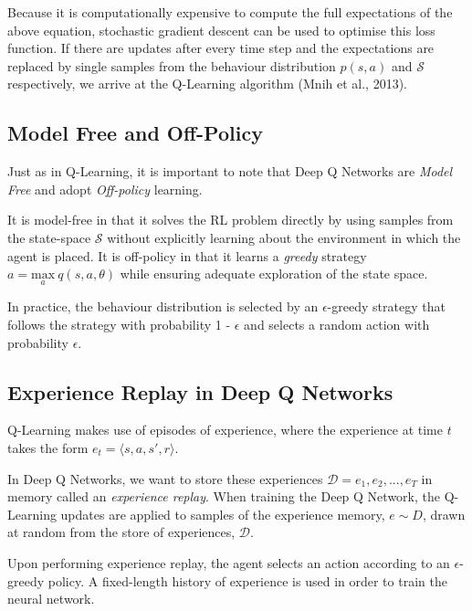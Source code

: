 \documentclass{article}
\begin{document}
Because it is computationally expensive to compute the full expectations of the above equation, stochastic gradient descent can be used to optimise this loss function. If there are updates after every time step and the expectations are replaced by single samples from the behaviour distribution $p(s,a)$ and $\mathcal{S}$ respectively, we arrive at the Q-Learning algorithm (Mnih et al., 2013). 

\newpage 

\subsection{Model Free and Off-Policy}

Just as in Q-Learning, it is important to note that Deep Q Networks are \textit{Model Free} and  adopt \textit{Off-policy} learning.  

It is model-free in that it solves the RL problem directly by using samples from the state-space $\mathcal{S}$ without explicitly learning about the environment in which the agent is placed. It is off-policy in that it learns a \textit{greedy} strategy $a = \underset{a}{\text{max}}\ q(s,a,\theta)$ while ensuring adequate exploration of the state space\cite{RLNotes}\cite{mnih2013atari}. 

In practice, the behaviour distribution is selected by an $\epsilon$-greedy strategy that follows the strategy with probability 1 - $\epsilon$ and selects a random action with probability $\epsilon$\cite{mnih2013atari}.

\subsection{Experience Replay in Deep Q Networks}

Q-Learning makes use of episodes of experience, where the experience at time $t$ takes the form $e_t = \langle s, a, s', r \rangle$. 

In Deep Q Networks, we want to store these experiences $\mathcal{D} = e_1, e_2, ..., e_T$ in memory called an \textit{experience replay}. When training the Deep Q Network, the Q-Learning updates are applied to samples of the experience memory, $e \sim D$, drawn at random from the store of experiences, $\mathcal{D}$\cite{mnih2013atari}. 

Upon performing experience replay, the agent selects an action according to an $\epsilon$-greedy policy. A fixed-length history of experience is used in order to train the neural network. 
\end{document}
